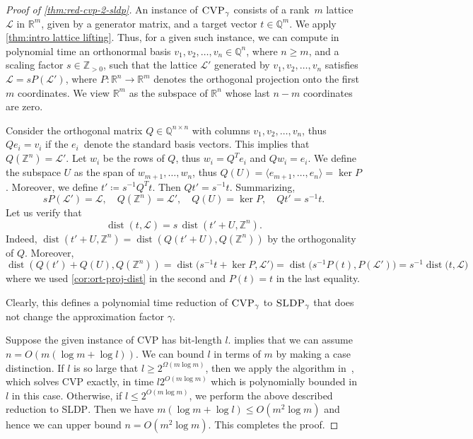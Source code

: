 \documentclass[a4paper,USenglish,cleveref,numberwithinsect]{lipics-v2021}
\DeclareMathOperator{\dist}{dist}
\newcommand{\QQ}{\mathbb{Q}}
\newcommand{\ZZ}{\mathbb{Z}}
\newcommand{\RR}{\mathbb{R}}
\numberwithin{equation}{section}
\begin{document}
\begin{proof}[Proof of \cref{thm:red-cvp-2-sldp}]
An instance of $\textsc{CVP}_\gamma$
consists of a rank~$m$ lattice $\mathcal{L}$ in $\RR^m$, given by a generator matrix,
and a target vector $t\in\QQ^m$.
We apply \cref{thm:intro lattice lifting}.
Thus, for a given such instance,
we can compute in polynomial time
an orthonormal basis $v_1,v_2,\dots,v_n\in\QQ^n$, where
$n\geq m$, and a scaling factor $s\in\ZZ_{>0}$, such that
the lattice $\mathcal{L}'$ generated by $v_1,v_2,\dots,v_n$
satisfies
$\mathcal{L} = s P(\mathcal{L}')$,
where $P\colon\RR^n\to\RR^m$ denotes the orthogonal projection
onto the first $m$ coordinates. We view $\RR^m$ as the subspace of $\RR^n$ whose last $n-m$ coordinates are zero.

Consider the orthogonal matrix $Q\in\QQ^{n\times n}$ with columns $v_1,v_2,\dots,v_n$,
thus $Q e_i = v_i$ if the $e_i$~denote the standard basis vectors.
This implies that $Q(\ZZ^n)=\mathcal{L}'$.
Let $w_i$ be the rows of $Q$, thus $w_i = Q^T e_i$ and $Qw_i= e_i$.
We define the subspace $U$ as the span of $w_{m+1},\ldots,w_n$,
thus $Q(U)= \langle e_{m+1},\ldots, e_{n} \rangle = \ker P$.
Moreover, we define $t'\coloneqq s^{-1} Q^T t$.
Then $Qt' = s^{-1} t$. Summarizing,
$$
  s P(\mathcal{L}') = \mathcal{L}, \quad
 Q(\ZZ^n)=\mathcal{L}', \quad Q(U) =  \ker P, \quad Qt' = s^{-1} t .
$$
Let us verify that
\begin{equation}\label{eq:dist-equality}
	\dist(t,\mathcal{L}) = s\, \dist(t'+U,\ZZ^n) .
\end{equation}
Indeed,
$\dist(t'+U,\ZZ^n) = \dist(Q(t'+U),Q(\ZZ^n))$
by the orthogonality of $Q$. Moreover,
\begin{equation*}
 \dist(Q(t') + Q(U),Q(\ZZ^n)) = \dist \big( s^{-1} t + \ker P, \mathcal{L}' \big)
 = \dist \big(  s^{-1} P( t),  P(\mathcal{L}') \big)
= s^{-1}  \dist \big( t , \mathcal{L} \big)
\end{equation*}
where we used \cref{cor:ort-proj-dist} in the second and $P(t)=t$ in the last equality.

Clearly, this defines a polynomial time reduction of
$\textsc{CVP}_{\gamma}$ to $\textsc{SLDP}_{\gamma}$
that does not change the approximation factor $\gamma$.

Suppose the given instance of \textsc{CVP} has bit-length $l$.
 implies that we can assume
$n=O(m (\log m +\log l))$.
We can bound $l$ in terms of $m$ by making
a case distinction.
If $l$ is so large that
$l \ge 2^{\Omega(m\log m)}$,
then we apply the algorithm in~\cite{kannan1987},
which solves \textsc{CVP} exactly, in time
$l2^{O(m\log m)}$ which is polynomially bounded in $l$ in this case.
Otherwise, if $l \le 2^{O(m\log m)}$, we perform the above described
reduction to \textsc{SLDP}. Then we have
$m(\log m +\log l) \le O(m^2 \log m)$ and hence
we can upper bound $n= O(m^2 \log m)$.
This completes the proof.
\end{proof}
\end{document}
